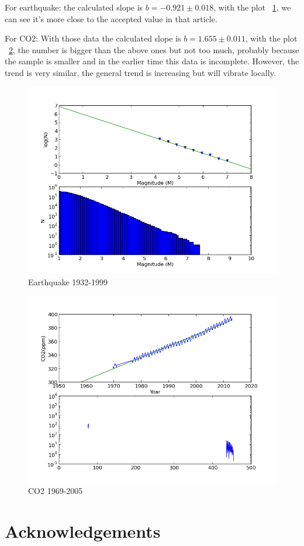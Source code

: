 \documentclass[11pt,letterpaper]{article}
\begin{document}
For earthquake: the calculated slope is $b=-0.921\pm0.018$, with the plot ~\ref{figure5}, we can see it's more close to the accepted value in that article.

For CO2: With those data the calculated slope is $b=1.655\pm0.011$, with the plot ~\ref{figure6}, the number is bigger than the above ones but not too much, probably because the sample is smaller and in the earlier time this data is incomplete. However, the trend is very similar, the general trend is increasing but will vibrate locally.   



\begin{figure}
\begin{center}
\includegraphics[width=0.6\linewidth,angle=0]{quake3.png}
\caption{Earthquake 1932-1999}
\label{figure5}
\end{center}
\end{figure}

\begin{figure}
\begin{center}
\includegraphics[width=0.6\linewidth,angle=0]{q3.png}
\caption{CO2 1969-2005}
\label{figure6}
\end{center}
\end{figure}




\newpage
\section*{Acknowledgements}
\end{document}
